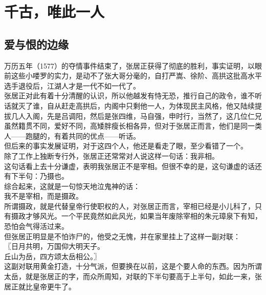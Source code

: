 \section{千古，唯此一人}
\ifnum{}
	\begin{multicols}{\theparacolNo}
\fi
\subsection{爱与恨的边缘}
万历五年（1577）的夺情事件结束了，张居正获得了彻底的胜利，事实证明，以眼前这些小喽罗的实力，是动不了张大哥分毫的，自打严嵩、徐阶、高拱这批高水平选手退役后，江湖人才是一代不如一代了。\\

张居正对此有着十分清醒的认识，所以他越发有恃无恐，推行自己的政令，谁不听话就灭了谁，自从赶走高拱后，内阁中只剩他一人，为体现民主风格，他又陆续提拔几人入阁，先是吕调阳，然后是张四维，马自强，申时行，当然了，这几位仁兄虽然籍贯不同，爱好不同，高矮胖瘦长相各异，但对于张居正而言，他们是同一类人——跑腿的，有着共同的优点——听话。\\

但后来的事实发展证明，对于这四个人，他还是看走了眼，至少看错了一个。\\

除了工作上独断专行外，张居正还常常对人说这样一句话：我非相。\\

这句话看上去十分谦虚，表明我张居正不是宰相。但很不幸的是，这句谦虚的话还有下半句：乃摄也。\\

综合起来，这就是一句惊天地泣鬼神的话：\\

我不是宰相，而是摄政。\\

所谓摄政，就是代替皇帝行使职权的人，对张居正而言，宰相已经是小儿科了，只有摄政才够风光。一个平民竟然如此风光，如果当年废除宰相的朱元璋泉下有知，恐怕会气得活过来。\\

但张居正明显是不怕诈尸的，他受之无愧，并在家里挂上了这样一副对联：\\

〖日月共明，万国仰大明天子。\\

丘山为岳，四方颂太岳相公。〗\\

这副对联用黄金打造，十分气派，但要换在以前，这是个要人命的东西。因为所谓太岳，就是张居正的字，而众所周知，对联的下半句要高于上半句，如此一来，张居正就比皇帝更牛了。\\


\end{multicols}
